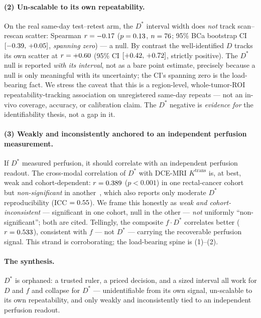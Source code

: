 \documentclass[11pt]{article}
\newcommand{\Dstar}{D^{*}}
\begin{document}
\paragraph{(2) Un-scalable to its own repeatability.} On the real same-day test--retest arm, the
$\Dstar$ interval width does \emph{not} track scan--rescan scatter: Spearman $r=-0.17$
($p=0.13$, $n=76$; 95\% BCa bootstrap CI $[-0.39,\,+0.05]$,
\emph{spanning zero}) --- a null. By contrast the well-identified $D$ tracks its own scatter at
$r=+0.60$ (95\% CI $[+0.42,\,+0.72]$, strictly positive). The $\Dstar$ null is reported
\emph{with its interval}, not as a bare point estimate, precisely because a null is only
meaningful with its uncertainty; the CI's spanning zero is the load-bearing fact. We stress the
caveat that this is a region-level, whole-tumor-ROI repeatability-tracking association on
unregistered same-day repeats --- not an in-vivo coverage, accuracy, or calibration claim. The
$\Dstar$ negative is \emph{evidence for} the identifiability thesis, not a gap in it.

\paragraph{(3) Weakly and inconsistently anchored to an independent perfusion measurement.}
If $\Dstar$ measured perfusion, it should correlate with an independent perfusion readout. The
cross-modal correlation of $\Dstar$ with DCE-MRI $K^{\mathrm{trans}}$ is, at best, weak and
cohort-dependent: $r=0.389$ ($p<0.001$) in one rectal-cancer cohort~\citep{sun2019} but
\emph{non-significant} in another~\citep{yang2019}, which also reports only moderate $\Dstar$
reproducibility (ICC $=0.55$). We frame this honestly as \emph{weak and
cohort-inconsistent} --- significant in one cohort, null in the other --- \emph{not} uniformly
``non-significant''; both are cited. Tellingly, the composite $f\!\cdot\!\Dstar$ correlates
better ($r=0.533$), consistent with $f$ --- not $\Dstar$ --- carrying the recoverable
perfusion signal. This strand is corroborating; the load-bearing spine is (1)--(2).

\paragraph{The synthesis.} $\Dstar$ is orphaned: a trusted ruler, a priced decision, and a sized
interval all work for $D$ and $f$ and collapse for $\Dstar$ --- unidentifiable from its own
signal, un-scalable to its own repeatability, and only weakly and inconsistently tied to an
independent perfusion readout.
\end{document}
